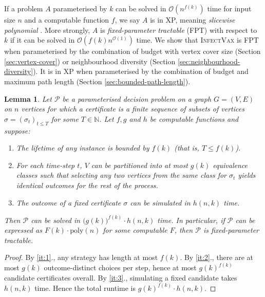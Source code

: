 \documentclass[unknownkeysallowed]{article}
\newtheorem{lemma}[theorem]{Lemma}
\theoremstyle{definition}\newtheorem{strategy}{Strategy}
\theoremstyle{definition}\newtheorem{notation}{Notation}[theorem]
\newcommand*{\IV}{\textup{\textsc{InfectVax}}\xspace}
\newcommand*{\bigO}[1]{\mathcal{O}({#1})}
\begin{document}
If a problem $A$ parameterised by $k$ can be solved in $\bigO{n^{f(k)}}$ time for input size $n$ and a computable function $f$, we say $A$ is in XP, meaning \emph{slicewise polynomial} \cite{downey_1999}. More strongly, $A$ is \emph{fixed-parameter tractable} (FPT) with respect to $k$ if it can be solved in $\bigO{f(k)n^{\bigO{1}}}$ time.  
We show that \IV is FPT when parameterised by the combination of budget with vertex cover size (Section \ref{sec:vertex-cover}) or neighbourhood diversity (Section \ref{sec:neighbourhood-diversity}).  It is in XP when parameterised by the combination of budget and maximum path length (Section \ref{sec:bounded-path-length}).

\begin{lemma}\label{lem:fpt-simulation}
  Let $\mathcal{P}$ be a parameterised decision problem on a graph $G=(V, E)$ on $n$ vertices for which a certificate is a finite sequence of subsets of vertices $\sigma=(\sigma_t)_{t\leq T}$ for some $T\in\mathbb{N}$. Let $f, g$ and $h$ be computable functions and suppose:
  \begin{enumerate}
    \item The lifetime of any instance is bounded by $f(k)$ (that is, $T\leq f(k)$). \label{it:1}
    \item For each time-step $t$, $V$ can be partitioned into at most $g(k)$ equivalence classes such that selecting any two vertices from the same class for $\sigma_t$ yields identical outcomes for the rest of the process. \label{it:2}
    \item The outcome of a fixed certificate $\sigma$ can be simulated in $h(n,k)$ time.\label{it:3}
  \end{enumerate}
  Then $\mathcal{P}$ can be solved in $\big(g(k)\big)^{f(k)} \cdot h(n,k)$ time. In particular, if $\mathcal{P}$ can be expressed as $F(k)\cdot \mathrm{poly}(n)$ for some computable $F$, then $\mathcal{P}$ is fixed-parameter tractable.
\end{lemma}

\begin{proof}
  By \ref{it:1}., any strategy has length at most $f(k)$. By \ref{it:2}., there are at most $g(k)$ outcome-distinct choices per step, hence at most $g(k)^{f(k)}$ candidate certificates overall. By \ref{it:3}., simulating a fixed candidate takes $h(n,k)$ time. Hence the total runtime is $g(k)^{f(k)}\cdot h(n,k)$.
\end{proof}
\end{document}
